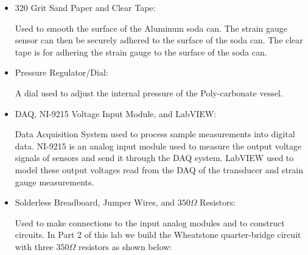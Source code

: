 \documentclass{article}
\begin{document}
\begin{itemize}
\item 320 Grit Sand Paper and Clear Tape: 
\vspace{1mm}

Used to smooth the surface of the Aluminum soda can. The strain gauge sensor can then be securely adhered to the surface of the soda can. The clear tape is for adhering the strain gauge to the surface of the soda can.

\item Pressure Regulator/Dial: 
\vspace{1mm}

A dial used to adjust the internal pressure of the Poly-carbonate vessel.
\vspace{2.5mm}

\item DAQ, NI-9215 Voltage Input Module, and LabVIEW:
\vspace{1mm}

Data Acquisition System used to process sample measurements into digital data. NI-9215 is an analog input module used to measure the output voltage signals of sensors and send it through the DAQ system. LabVIEW used to model these output voltages read from the DAQ of the transducer and strain gauge measurements.
\vspace{2.5mm}

\item Solderless Breadboard, Jumper Wires, and $350\Omega$ Resistors: 
\vspace{1mm}

Used to make connections to the input analog modules and to construct circuits. In Part 2 of this lab we build the Wheatstone quarter-bridge circuit with three $350\Omega$ resistors as shown below:


\end{itemize}
\end{document}
